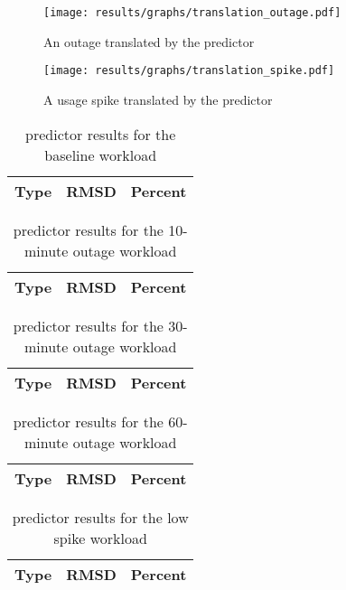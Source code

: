 \begin{figure}
\centering
\texttt{[image: results/graphs/translation\_outage.pdf]}
\caption{An outage translated by the  predictor}
\label{fig:translation_outage}
\end{figure}

\begin{figure}
\centering
\texttt{[image: results/graphs/translation\_spike.pdf]}
\caption{A usage spike translated by the  predictor}
\label{fig:translation_spike}
\end{figure}

\begin{table}[H]
\centering
\begin{tabular}{| l | l | l |}
\hline
Type & RMSD & Percent \\ \hline
\end{tabular}
\caption{predictor results for the baseline workload}
\end{table}


\begin{table}[H]
\centering
\begin{tabular}{| l | l | l |}
\hline
Type & RMSD & Percent \\ \hline

\end{tabular}
\caption{predictor results for the 10-minute outage workload}
\end{table}

\begin{table}[H]
\centering
\begin{tabular}{| l | l | l |}
\hline
Type & RMSD & Percent \\ \hline

\end{tabular}
\caption{predictor results for the 30-minute outage workload}
\end{table}

\begin{table}[H]
\centering
\begin{tabular}{| l | l | l |}
\hline
Type & RMSD & Percent \\ \hline

\end{tabular}
\caption{predictor results for the 60-minute outage workload}
\end{table}


\begin{table}[H]
\centering
\begin{tabular}{| l | l | l |}
\hline
Type & RMSD & Percent \\ \hline

\end{tabular}
\caption{predictor results for the low spike workload}
\end{table}


